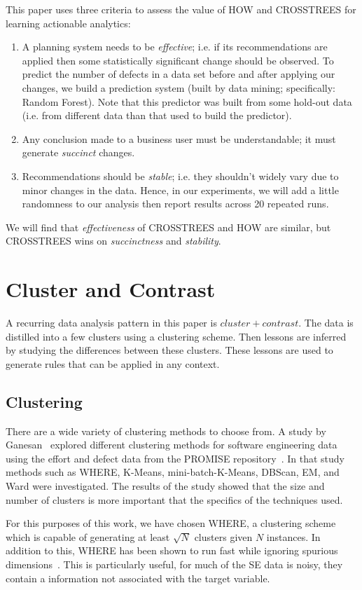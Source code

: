 \documentclass{sig-alternate}
\newcommand{\be}{\begin{enumerate}}
\newcommand{\ee}{\end{enumerate}}
\begin{document}
This paper uses three criteria to assess the value of HOW and CROSSTREES for
learning actionable analytics:
\be
\item
A planning system needs to be {\em effective}; i.e. if its recommendations
are applied then some statistically significant change should be observed.
To predict the number of defects in a data set before and after applying our changes,
we build a    prediction system (built by data mining; specifically: Random Forest). Note that this
predictor was built from some hold-out data (i.e. from  different data than that used
to build the predictor).
\item
Any  conclusion made to a business user must be understandable;
it must generate {\em succinct} changes.  
\item
Recommendations should be {\em stable}; i.e. they shouldn't widely vary due to minor changes in the data. Hence, in our experiments, we will add a little randomness to our analysis then report results across 20 repeated runs. 
\ee
We will find that
 {\em effectiveness} of CROSSTREES and HOW are similar, but   CROSSTREES wins on {\em succinctness} and {\em stability}.

\section{Cluster and Contrast}
\label{clust_contrast}
A recurring data analysis pattern in this paper is $cluster+contrast$. The data is distilled into a few clusters using a clustering scheme. Then lessons are inferred by studying the differences between these clusters. These lessons are used to generate rules that can be applied in any context.

\subsection{Clustering}
There are a wide variety of clustering methods to choose from. A study by Ganesan~\cite{div14} explored different clustering methods for software engineering data using the effort and defect data from the PROMISE repository~\cite{promise}. In that study methods such as WHERE, K-Means, mini-batch-K-Means, DBScan, EM, and Ward were investigated. The results of the study showed that the size and number of clusters is more important that the specifics of the techniques used. 

For this purposes of this work, we have chosen WHERE, a clustering scheme which is capable of generating at least $\sqrt{N}$ clusters given $N$ instances. In addition to this, WHERE has been shown to run fast while ignoring spurious dimensions~\cite{menzies2013}. This is particularly useful, for much of the SE data is noisy, they contain a information not associated with the target variable. 
\end{document}
